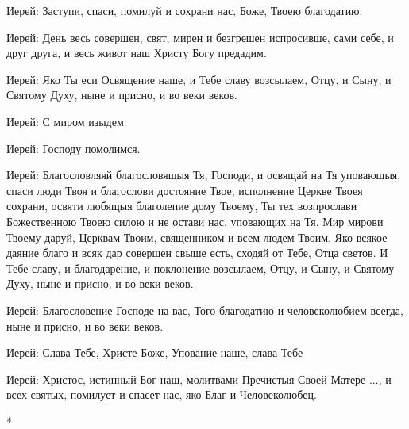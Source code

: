 \documentclass[12pt,a4paper,titlepage]{report}
\begin{document}
\begin{paracol}[1]{2}

  Иерей: Заступи, спаси, помилуй и сохрани нас, Боже, Твоею благодатию.


  Иерей: День весь совершен, свят, мирен и безгрешен испросивше, сами себе, и друг друга, и весь живот наш Христу Богу предадим.


  Иерей: Яко Ты еси Освящение наше, и Тебе славу возсылаем, Отцу, и Сыну, и Святому Духу, ныне и присно, и во веки веков.


  Иерей: С миром изыдем.


  Иерей: Господу помолимся.


  Иерей: Благословляяй благословящыя Тя, Господи, и освящай на Тя уповающыя, спаси люди Твоя и благослови достояние Твое, исполнение Церкве Твоея сохрани, освяти любящыя благолепие дому Твоему, Ты тех возпрослави Божественною Твоею силою и не остави нас, уповающих на Тя. Мир мирови Твоему даруй, Церквам Твоим, священником и всем людем Твоим. Яко всякое даяние благо и всяк дар совершен свыше есть, сходяй от Тебе, Отца светов. И Тебе славу, и благодарение, и поклонение возсылаем, Отцу, и Сыну, и Святому Духу, ныне и присно, и во веки веков.


  Иерей: Благословение Господе на вас, Того благодатию и человеколюбием всегда, ныне и присно, и во веки веков.


  Иерей: Слава Тебе, Христе Боже, Упование наше, слава Тебе


  Иерей: Христос, истинный Бог наш, молитвами Пречистыя Своей Матере ..., и всех святых, помилует и спасет нас, яко Благ и Человеколюбец.


  \switchcolumn[0]*

  \switchcolumn[1]
\end{paracol}
\end{document}
